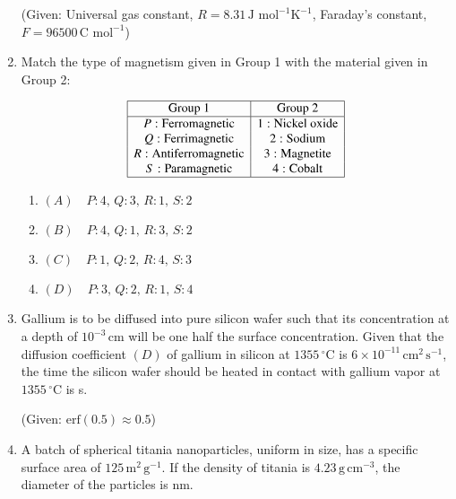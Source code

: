 \documentclass[journal]{IEEEtran}
\numberwithin{equation}{enumi}
\numberwithin{figure}{enumi}
\begin{document}
\begin{enumerate}
    (Given: Universal gas constant, $R = 8.31 \, \text{J mol}^{-1} \text{K}^{-1}$, Faraday's constant, $F = 96500 \, \text{C mol}^{-1}$)
    
    \bigskip

    \item Match the type of magnetism given in Group 1 with the material given in Group 2:
    
    \[
    \begin{array}{|c|c|}
    \hline
    \text{Group 1} & \text{Group 2} \\
    \hline
    P: \text{Ferromagnetic} & 1: \text{Nickel oxide} \\
    Q: \text{Ferrimagnetic} & 2: \text{Sodium} \\
    R: \text{Antiferromagnetic} & 3: \text{Magnetite} \\
    S: \text{Paramagnetic} & 4: \text{Cobalt} \\
    \hline
    \end{array}
    \]
    
    \begin{enumerate}
        \item $(A) \quad P: 4, \, Q: 3, \, R: 1, \, S: 2$
        \item $(B) \quad P: 4, \, Q: 1, \, R: 3, \, S: 2$
        \item $(C) \quad P: 1, \, Q: 2, \, R: 4, \, S: 3$
        \item $(D) \quad P: 3, \, Q: 2, \, R: 1, \, S: 4$
    \end{enumerate}
    
    \bigskip

    \item Gallium is to be diffused into pure silicon wafer such that its concentration at a depth of $10^{-3} \, \text{cm}$ will be one half the surface concentration. Given that the diffusion coefficient $(D)$ of gallium in silicon at $1355 \, ^\circ \text{C}$ is $6 \times 10^{-11} \, \text{cm}^2 \, \text{s}^{-1}$, the time the silicon wafer should be heated in contact with gallium vapor at $1355 \, ^\circ \text{C}$ is \underline{\hspace{1cm}} s.
    
    (Given: $\text{erf}(0.5) \approx 0.5$)
    \bigskip
    \item A batch of spherical titania nanoparticles, uniform in size, has a specific surface area of $125 \, \text{m}^2 \, \text{g}^{-1}$. If the density of titania is $4.23 \, \text{g} \, \text{cm}^{-3}$, the diameter of the particles is \underline{\hspace{1cm}} nm.
    

\end{enumerate}
\end{document}
